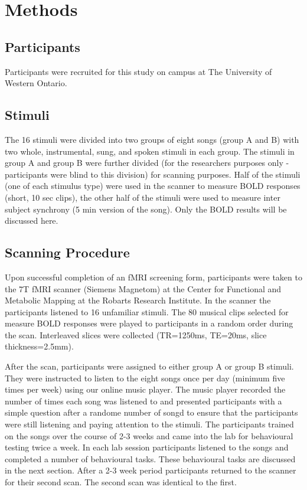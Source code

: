 \documentclass[12pt,letterpaper]{report}
\begin{document}
\section{Methods}
\subsection{Participants}
Participants were recruited for this study on campus at The University of Western Ontario. 
\subsection{Stimuli}
The 16 stimuli were divided into two groups of eight songs (group A and B) with two whole, instrumental, sung, and spoken stimuli in each group.
The stimuli in group A and group B were further divided (for the researchers purposes only - participants were blind to this division) for scanning purposes. 
Half of the stimuli (one of each stimulus type) were used in the scanner to measure BOLD responses (short, 10 sec clips), the other half of the stimuli were used to measure inter subject synchrony (5 min version of the song). Only the BOLD results will be discussed here. 
\subsection{Scanning Procedure}
Upon successful completion of an fMRI screening form, participants were taken to the 7T fMRI scanner (Siemens Magnetom) at the Center for Functional and Metabolic Mapping at the Robarts Research Institute. 
In the scanner the participants listened to 16 unfamiliar stimuli. 
The 80 musical clips selected for measure BOLD responses were played to participants in a random order during the scan. 
Interleaved slices were collected (TR=1250ms, TE=20ms, slice thickness=2.5mm).

After the scan, participants were assigned to either group A or group B stimuli. They were instructed to listen to the eight songs once per day (minimum five times per week) using our online music player. 
The music player recorded the number of times each song was listened to and presented participants with a simple question after a randome number of songd to ensure that the participants were still listening and paying attention to the stimuli. 
The participants trained on the songs over the course of 2-3 weeks and came into the lab for behavioural testing twice a week. 
In each lab session participants listened to the songs and completed a number of behavioural tasks. These behavioural tasks are discussed in the next section. 
After a 2-3 week period participants returned to the scanner for their second scan. The second scan was identical to the first.
\end{document}
